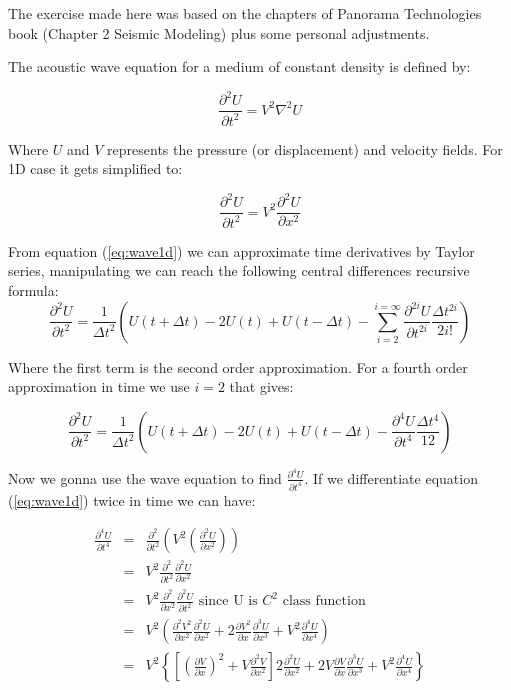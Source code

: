 \documentclass[legalpaper, 12pt]{book}
\begin{document}
The exercise made here was based on the chapters of Panorama Technologies book (Chapter 2 Seismic Modeling) plus some personal adjustments.

The acoustic wave equation for a medium of constant density is defined by:

\[ \frac{\partial^2 U}{\partial t^2} = V^2 \nabla^2 U \]

Where $U$ and $V$ represents the pressure (or displacement) and velocity fields. For 1D case it gets simplified to:

\begin{equation}
\frac{\partial^2 U}{\partial t^2} = V^2 \frac{\partial^2 U}{\partial x^2}
\label{eq:wave1d}
\end{equation}

From equation (\ref{eq:wave1d}) we can approximate time derivatives by Taylor series, manipulating we can reach the following  central differences recursive formula:
\[ \frac{\partial^2 U}{\partial t^2} = \frac{1}{\Delta t^2} \left( U(t+\Delta t) -2 U(t) + U(t-\Delta t) - \sum_{i=2}^{i=\infty} \frac{\partial^{2i} U}{\partial t^{2i}} \frac{\Delta t^{2i}}{2i!} \right) \]

Where the first term is the second order approximation. For a fourth order approximation in time we use $i=2$ that gives:

\begin{equation}
\frac{\partial^2 U}{\partial t^2} = \frac{1}{\Delta t^2} \left( U(t+\Delta t) -2 U(t) + U(t-\Delta t) - \frac{\partial^{4} U}{\partial t^{4}} \frac{\Delta t^{4}}{12}\right)
\label{eq:partial4}
\end{equation}

Now we gonna use the wave equation to find $\frac{\partial^{4} U}{\partial t^{4}}$. If we differentiate equation (\ref{eq:wave1d}) twice in time we can have:

\begin{eqnarray}
\frac{\partial^4 U}{\partial t^4} &=& \frac{\partial^2 }{\partial t^2} \left( V^2 \left( \frac{\partial^2 U}{\partial x^2} \right) \right) \nonumber \\
& =&  V^2 \frac{\partial^2 }{\partial t^2} \frac{\partial^2 U}{\partial x^2} \nonumber \\
&=&  V^2 \frac{\partial^2 }{\partial x^2} \frac{\partial^2 U}{\partial t^2}  \mbox { since U is $C^2$ class function } \nonumber \\
&=& V^2 \left( \frac{\partial^2 V^2}{\partial x^2} \frac{\partial^2 U}{\partial x^2} + 2 \frac{\partial V^2}{\partial x} \frac{\partial^3 U}{\partial x^3} + V^2 \frac{\partial^4 U}{\partial x^4} \right) \nonumber \\
&=& V^2 \left\{ \left[ \left(  \frac{\partial V}{\partial x} \right)^2 + V  \frac{\partial^2 V}{\partial x^2} \right] 2 \frac{\partial^2 U}{\partial x^2} + 2 V \frac{\partial V}{\partial x}  \frac{\partial^3 U}{\partial x^3} +  V^2 \frac{\partial^4 U}{\partial x^4}\right\}
\label{eq:partial4final}
\end{eqnarray}
\end{document}

